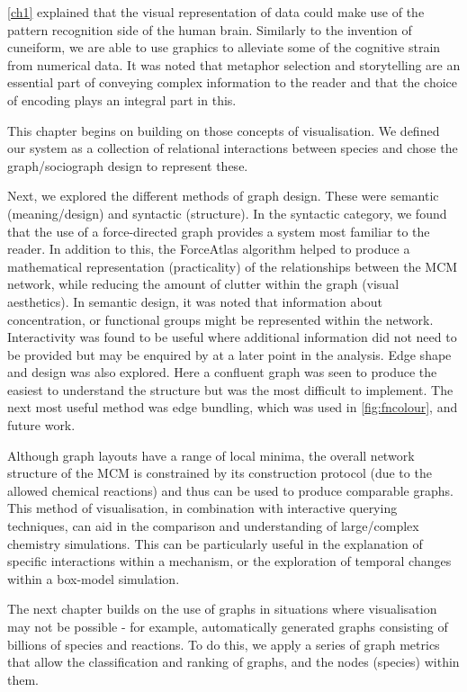\autoref{ch1} explained that the visual representation of data could make use of the pattern recognition side of the human brain. Similarly to the invention of cuneiform, we are able to use graphics to alleviate some of the cognitive strain from numerical data. It was noted that metaphor selection and storytelling are an essential part of conveying complex information to the reader and that the choice of encoding plays an integral part in this.

This chapter begins on building on those concepts of visualisation. We defined our system as a collection of relational interactions between species and chose the graph/sociograph design to represent these.

Next, we explored the different methods of graph design. These were semantic (meaning/design) and syntactic (structure). In the syntactic category, we found that the use of a force-directed graph provides a system most familiar to the reader. In addition to this, the ForceAtlas algorithm helped to produce a mathematical representation (practicality) of the relationships between the MCM network, while reducing the amount of clutter within the graph (visual aesthetics). In semantic design, it was noted that information about concentration, or functional groups might be represented within the network. Interactivity was found to be useful where additional information did not need to be provided but may be enquired by at a later point in the analysis. Edge shape and design was also explored. Here a confluent graph was seen to produce the easiest to understand the structure but was the most difficult to implement. The next most useful method was edge bundling, which was used in \autoref{fig:fncolour}, and future work.

Although graph layouts have a range of local minima, the overall network structure of the MCM is constrained by its construction protocol (due to the allowed chemical reactions) and thus can be used to produce comparable graphs. This method of visualisation, in combination with interactive querying techniques, can aid in the comparison and understanding of large/complex chemistry simulations. This can be particularly useful in the explanation of specific interactions within a mechanism, or the exploration of temporal changes within a box-model simulation.

The next chapter builds on the use of graphs in situations where visualisation may not be possible - for example, automatically generated graphs consisting of billions of species and reactions. To do this, we apply a series of graph metrics that allow the classification and ranking of graphs, and the nodes (species) within them.
